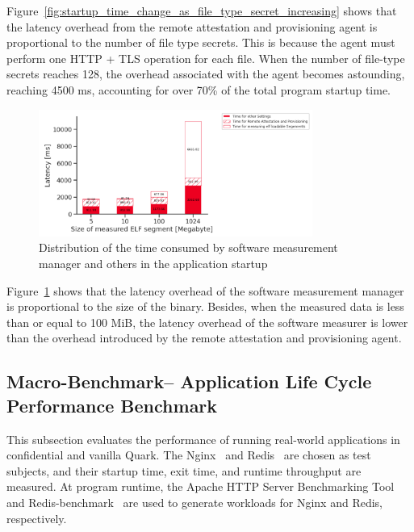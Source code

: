 Figure~\ref{fig:startup_time_change_as_file_type_secret_increasing} shows that the latency overhead from the remote attestation and provisioning agent is proportional to the number of file type secrets. 
This is because the agent must perform one HTTP + TLS operation for each file. When the number of file-type secrets reaches 128, the overhead associated with the agent becomes astounding, reaching 4500 ms, accounting for over 70\% of the total program startup time.
\begin{figure}[!htb]
    \centering
    \includegraphics[width=0.8\textwidth]{images/startup_time_change_as_elf_size_increasing.PNG}
    \caption[Distribution of the time consumed by software measurement manager and others in the Application Startup]{Distribution of the time consumed by software measurement manager and others in the application startup}
    \label{fig:startup_time_change_as_elf_size_increasing}
\end{figure}


Figure~\ref{fig:startup_time_change_as_elf_size_increasing} shows that the latency overhead of the software measurement manager is proportional to the size of the binary. Besides, when the measured data is less than or equal to 100 MiB, the latency overhead of the software measurer is lower than the 
overhead introduced by the remote attestation and provisioning agent.


\subsection{Macro-Benchmark– Application Life Cycle Performance Benchmark}
\label{macri_app_start_up}

This subsection evaluates the performance of running real-world applications in confidential and vanilla Quark. The Nginx~\cite*{nginx} and Redis~\cite*{redis} are chosen as test subjects, and their startup time, exit time, and runtime throughput are measured. At program runtime, the Apache HTTP 
Server Benchmarking Tool~\cite*{ab} and Redis-benchmark~\cite*{Redis_benchmark} are used to generate workloads for Nginx and Redis, respectively.

